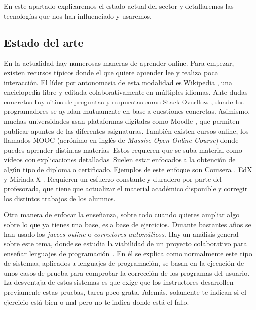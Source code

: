 
En este apartado explicaremos el estado actual del sector y detallaremos las tecnologías que nos han influenciado y usaremos.

\subsection{Estado del arte\label{subsec:introduction}}

En la actualidad hay numerosas maneras de aprender online. Para empezar, existen recursos típicos donde el que quiere aprender lee y realiza poca interacción. El líder por antonomasia de esta modalidad es Wikipedia \cite{wiki}, una enciclopedia libre y editada colaborativamente en múltiples idiomas. Ante dudas concretas hay sitios de preguntas y respuestas como Stack Overflow \cite{stack}, donde los programadores se ayudan mutuamente en base a cuestiones concretas. Asimismo, muchas universidades usan plataformas digitales como Moodle \cite{moodle}, que permiten publicar apuntes de las diferentes asignaturas. También existen cursos online, los llamados MOOC (acrónimo en inglés de \emph{Massive Open Online Course}) donde puedes aprender distintas materias. Estos requieren  que se suba material como vídeos con explicaciones detalladas. Suelen estar enfocados a la obtención de algún tipo de diploma o certificado. Ejemplos de este enfoque son Coursera \cite{coursera}, EdX \cite{edX} y Miriada X \cite{miriadaX}. Requieren un esfuerzo constante y duradero por parte del profesorado, que tiene que actualizar el material académico disponible y corregir los distintos trabajos de los alumnos. 

Otra manera de enfocar la enseñanza, sobre todo cuando quieres ampliar algo sobre lo que ya tienes una base, es a base de ejercicios. Durante bastantes años se han usado los \emph{jueces online} o \emph{correctores automáticos}. Hay un análisis general sobre este tema, donde se estudia la viabilidad de un proyecto colaborativo para enseñar lenguajes de programación~\cite{pimcdDuoCode14}. En él se explica como normalmente este tipo de sistemas, aplicados a lenguajes de programación, se basan en la ejecución de unos casos de prueba para comprobar la corrección de los programas del usuario. La desventaja de estos sistemas es que exige que los instructores desarrollen previamente estas pruebas, tarea poco grata. Además, solamente te indican si el ejercicio está bien o mal pero no te indica donde está el fallo.

